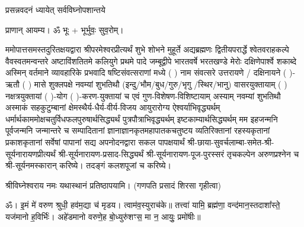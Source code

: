 
\setlength{\parindent}{0pt}





{प्रसन्नवदनं ध्यायेत् सर्वविघ्नोपशान्तये}
 
प्राणान्  आयम्य।  ॐ भूः + भूर्भुवः॒ सुव॒रोम्।


ममोपात्तसमस्तदुरितक्षयद्वारा श्रीपरमेश्वरप्रीत्यर्थं शुभे शोभने मुहूर्ते अद्यब्रह्मणः
द्वितीयपरार्द्धे श्वेतवराहकल्पे वैवस्वतमन्वन्तरे अष्टाविंशतितमे कलियुगे प्रथमे पादे
जम्बूद्वीपे भारतवर्षे भरतखण्डे मेरोः दक्षिणेपार्श्वे शकाब्दे अस्मिन् वर्तमाने व्यावहारिके
प्रभवादि षष्टिसंवत्सराणां मध्ये (	) नाम संवत्सरे उत्तरायणे / दक्षिनायने  (  )-ऋतौ  (  ) मासे 
शुक्लपक्षे नवम्यां शुभतिथौ (इन्दु/भौम/बुध/गुरु/भृगु /स्थिर/भानु) वासरयुक्तायाम्
(  ) नक्षत्रयुक्तायां (  )-योग (  )-करण-युक्तायां च एवं गुण-विशेषण-विशिष्टायाम्
अस्याम् नवम्यां शुभतिथौ अस्माकं सहकुटुम्बानां क्षेमस्थैर्य-धैर्य-वीर्य-विजय आयुरारोग्य ऐश्वर्याभिवृद्ध्यर्थम्
 धर्मार्थकाममोक्ष\-चतुर्विधफलपुरुषार्थसिद्ध्यर्थं पुत्रपौत्राभिवृद्ध्यर्थम् इष्टकाम्यार्थसिद्ध्यर्थम्
मम इहजन्मनि पूर्वजन्मनि जन्मान्तरे च सम्पादितानां ज्ञानाज्ञानकृतमहा\-पातकचतुष्टय
व्यतिरिक्तानां रहस्यकृतानां प्रकाशकृतानां सर्वेषां पापानां सद्य अपनोदनद्वारा सकल 
पापक्षयार्थं 
श्री-छाया-सुवर्चलाम्बा-समेत-श्री-सूर्यनारायणप्रीत्यर्थं
श्री-सूर्यनारायण-प्रसाद-सिद्ध्यर्थं श्री-सूर्यनारायण-पूज-पुरस्सरं तृचकल्पेन अरुणप्रश्नेन च श्री-सूर्यनमस्कारान् 
करिष्ये। तदङ्गं कलशपूजां च करिष्ये।


श्रीविघ्नेश्वराय नमः यथास्थानं प्रतिष्ठापयामि।
(गणपति प्रसादं शिरसा गृहीत्वा)












 

ॐ। इ॒मं मे॑ वरुण श्रुधी॒ हव॑म॒द्या च॑ मृडय। त्वाम॑व॒स्युराच॑के॥ तत्त्वा॑ यामि॒ ब्रह्म॑णा॒ वन्द॑मान॒स्तदाशा᳚स्ते॒ यज॑मानो ह॒विर्भिः॑। अहे॑डमानो वरुणे॒ह बो॒ध्युरु॑शꣳस॒ मा न॒ आयुः॒ प्रमो॑षीः॥

